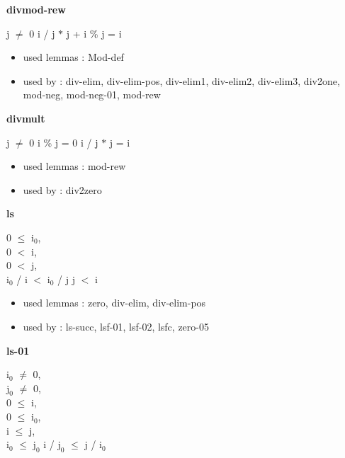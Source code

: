 \documentclass[a4paper]{article}
\begin{document}
\medskip

\bigskip

{\large\bf divmod-rew}

\medskip

j $\neq$ 0 \Fol i / j $*$ j + i \% j = i

\begin{itemize}


\item       used lemmas  : Mod-def
\item       used by      : div-elim, div-elim-pos, div-elim1, div-elim2, div-elim3, div2one, mod-neg, mod-neg-01, mod-rew

\end{itemize}

\medskip

\bigskip

{\large\bf divmult}

\medskip

j $\neq$ 0 \Fol i \% j = 0 \Imp i / j $*$ j = i

\begin{itemize}


\item       used lemmas  : mod-rew
\item       used by      : div2zero

\end{itemize}

\medskip

\bigskip

{\large\bf ls}

\medskip

0 $\le$ $\mbox{i}_{0}$, \\
0 $<$ i, \\
0 $<$ j, \\
$\mbox{i}_{0}$ / i $<$ $\mbox{i}_{0}$ / j \Fol j $<$ i

\begin{itemize}


\item       used lemmas  : zero, div-elim, div-elim-pos
\item       used by      : ls-succ, lsf-01, lsf-02, lsfc, zero-05

\end{itemize}

\medskip

\bigskip

{\large\bf ls-01}

\medskip

$\mbox{i}_{0}$ $\neq$ 0, \\
$\mbox{j}_{0}$ $\neq$ 0, \\
0 $\le$ i, \\
0 $\le$ $\mbox{i}_{0}$, \\
i $\le$ j, \\
$\mbox{i}_{0}$ $\le$ $\mbox{j}_{0}$ \Fol i / $\mbox{j}_{0}$ $\le$ j / $\mbox{i}_{0}$
\end{document}
